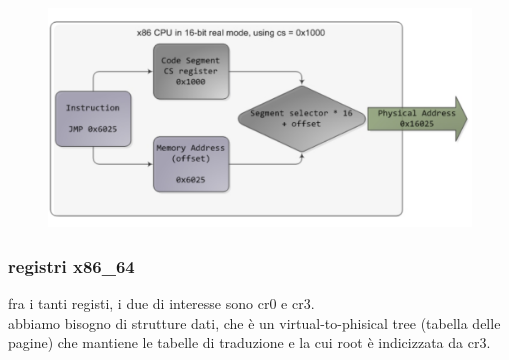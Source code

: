 \documentclass[12pt, oneside]{extbook} %
\begin{document}
\begin{figure}[!h]
	\includegraphics[scale=0.3]{immagini/seg_based_transl.png}
\end{figure}

\subsubsection{registri x86\_64}
fra i tanti registi, i due di interesse sono cr0 e cr3.\\abbiamo bisogno di strutture dati, che è un virtual-to-phisical tree (tabella delle pagine) che mantiene le tabelle di traduzione e la cui root è indicizzata da cr3.
\end{document}
